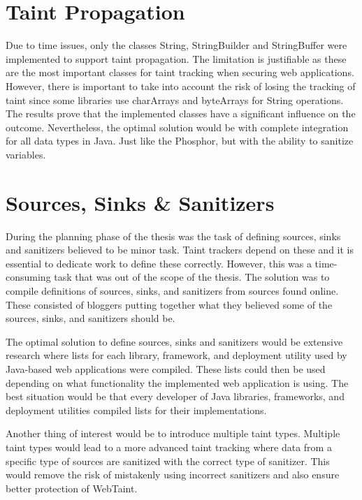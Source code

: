 \section{Taint Propagation}
\label{propagation}
Due to time issues, only the classes String, StringBuilder and StringBuffer were implemented to support taint propagation. The limitation is justifiable as these are the most important classes for taint tracking when securing web applications. However, there is important to take into account the risk of losing the tracking of taint since some libraries use charArrays and byteArrays for String operations. The results prove that the implemented classes have a significant influence on the outcome. Nevertheless, the optimal solution would be with complete integration for all data types in Java. Just like the Phosphor, but with the ability to sanitize variables.



\section{Sources, Sinks \& Sanitizers}
\label{sss}
During the planning phase of the thesis was the task of defining sources, sinks and sanitizers believed to be minor task. Taint trackers depend on these and it is essential to dedicate work to define these correctly. However, this was a time-consuming task that was out of the scope of the thesis. The solution was to compile definitions of sources, sinks, and sanitizers from sources found online. These consisted of bloggers putting together what they believed some of the sources, sinks, and sanitizers should be.

The optimal solution to define sources, sinks and sanitizers would be extensive research where lists for each library, framework, and deployment utility used by Java-based web applications were compiled. These lists could then be used depending on what functionality the implemented web application is using. The best situation would be that every developer of Java libraries, frameworks, and deployment utilities compiled lists for their implementations.

Another thing of interest would be to introduce multiple taint types. Multiple taint types would lead to a more advanced taint tracking where data from a specific type of sources are sanitized with the correct type of sanitizer. This would remove the risk of mistakenly using incorrect sanitizers and also ensure better protection of WebTaint.



